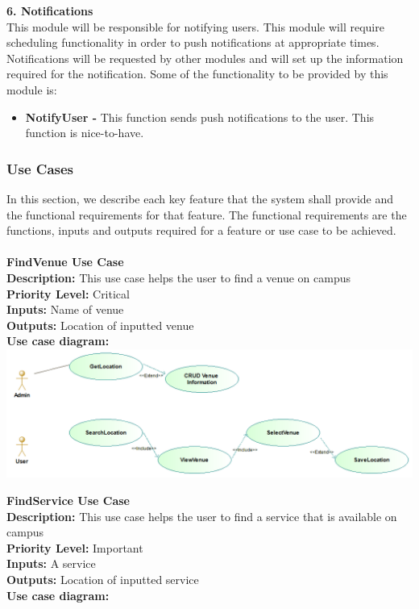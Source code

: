 \documentclass[a4paper,12pt]{article}
\begin{document}
\textbf{6. Notifications}\\
This module will be responsible for notifying users. This module will require scheduling functionality in order to push notifications at appropriate times. Notifications will be requested by other modules and will set up the information required for the notification. Some of the functionality to be provided by this module is:
\begin{itemize}
\item \textbf{NotifyUser -} This function sends push notifications to the user. This function is nice-to-have.
\end{itemize}

\subsubsection{Use Cases}
In this section, we describe each key feature that the system shall provide and the functional requirements for that feature. The functional requirements are the functions, inputs and outputs required for a feature or use case to be achieved. \\
\\
\textbf{\large FindVenue Use Case}\\
\textbf{Description: } This use case helps the user to find a venue on campus\\
\textbf{Priority Level: } Critical\\
\textbf{Inputs:} Name of venue\\
\textbf{Outputs:} Location of inputted venue\\
\textbf{Use case diagram: }\\
\includegraphics[width=\textwidth]{images/find_venue.png}


\textbf{\large FindService Use Case}\\
\textbf{Description: } This use case helps the user to find a service that is available on campus\\
\textbf{Priority Level:} Important\\
\textbf{Inputs:} A service\\
\textbf{Outputs:} Location of inputted service\\
\textbf{Use case diagram: }\\
\end{document}
